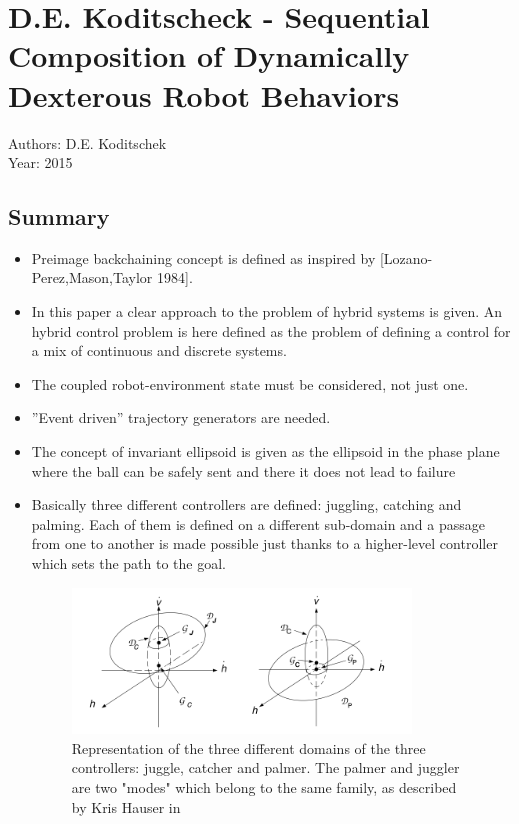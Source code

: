\section{D.E. Koditscheck - Sequential Composition of Dynamically Dexterous Robot Behaviors}
Authors: D.E. Koditschek\\
Year: 2015
\subsection*{Summary}
\begin{itemize}
\item Preimage backchaining concept is defined as inspired by [Lozano-Perez,Mason,Taylor 1984].
\item In this paper a clear approach to the problem of hybrid systems is given. An hybrid control problem is here defined as the problem of defining a control for a mix of continuous and discrete systems.
\item The coupled robot-environment state must be considered, not just one.
\item ''Event driven'' trajectory generators are needed.
\item The concept of invariant ellipsoid is given as the ellipsoid in the phase plane where the ball can be safely sent and there it does not lead to failure
\item Basically three different controllers are defined: juggling, catching and palming. Each of them is defined on a different sub-domain and a passage from one to another is made possible just thanks to a higher-level controller which sets the path to the goal.
\begin{figure}
  \centering
  \includegraphics[width=90mm]{Koditschek1}
  \caption{Representation of the three different domains of the three controllers: juggle, catcher and palmer. The palmer and juggler are two "modes" which belong to the same family, as described by Kris Hauser in \cite{Hauser2008}}
  \label{PhasePlane}
\end{figure}
\end{itemize}

